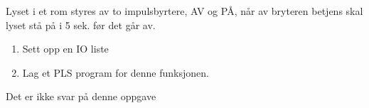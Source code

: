 


Lyset i et rom styres av to impulsbyrtere, AV og PÅ, når av bryteren
betjens skal lyset stå på i 5 sek. før det går av.
\begin{enumerate}
\item Sett opp en IO liste
\item Lag et PLS program for denne funksjonen.
\end{enumerate}
\vskip 10pt







Det er ikke svar på denne oppgave













